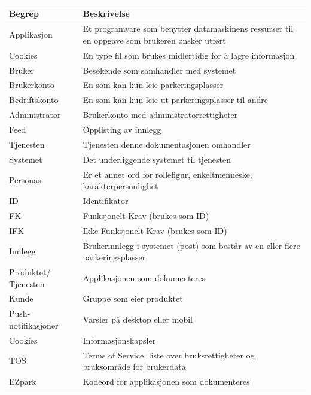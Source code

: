 \documentclass[12pt]{article}
\begin{document}
\begin{center}
    \begin{tabular}{|p{4cm}|p{12cm}|} 
        \hline
        \bf Begrep & \bf Beskrivelse\\
        \hline
        Applikasjon &  Et programvare som benytter datamaskinens ressurser til en oppgave som brukeren ønsker utført\\
        \hline
        Cookies & En type fil som brukes midlertidig for å lagre informasjon\\
        \hline
        Bruker & Besøkende som samhandler med systemet\\
        \hline
        Brukerkonto & En som kan kun leie parkeringsplasser\\
        \hline
        Bedriftskonto & En som kan kun leie ut parkeringsplasser til andre\\
        \hline
        Administrator & Brukerkonto med administratorrettigheter\\
        \hline
        Feed & Opplisting av innlegg\\
        \hline
        Tjenesten & Tjenesten denne dokumentasjonen omhandler\\
        \hline
        Systemet & Det underliggende systemet til tjenesten\\
        \hline
        Personas & Er et annet ord for rollefigur, enkeltmenneske, karakterpersonlighet\\
        \hline
        ID & Identifikator\\
        \hline
        FK & Funksjonelt Krav (brukes som ID)\\
        \hline
        IFK & Ikke-Funksjonelt Krav (brukes som ID)\\
        \hline
        Innlegg & Brukerinnlegg i systemet (post) som består av en eller flere parkeringsplasser\\
        \hline
        Produktet/ Tjenesten & Applikasjonen som dokumenteres\\
        \hline
        Kunde & Gruppe som eier produktet\\
        \hline
        Push-notifikasjoner & Varsler på desktop eller mobil \\
        \hline
        Cookies & Informasjonskapsler \\
        \hline
        TOS & Terms of Service, liste over bruksrettigheter og bruksområde for brukerdata \\
        \hline
        EZpark & Kodeord for applikasjonen som dokumenteres \\
        \hline
    \end{tabular}
\end{center}
\end{document}

